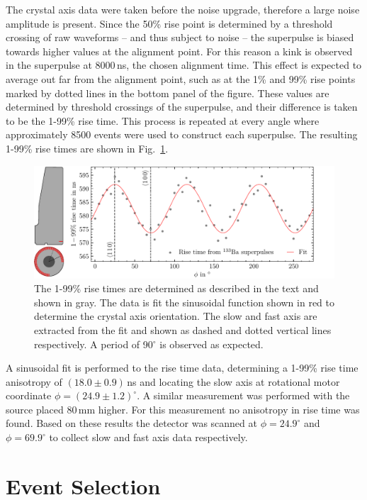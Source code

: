 The \BaS{} crystal axis data were taken before the noise upgrade, therefore a large noise amplitude is present. Since the 50\% rise point is determined by a threshold crossing of raw waveforms -- and thus subject to noise -- the superpulse is biased towards higher values at the alignment point. For this reason a kink is observed in the superpulse at 8000\,ns, the chosen alignment time. This effect is expected to average out far from the alignment point, such as at the 1\% and 99\% rise points marked by dotted lines in the bottom panel of the figure. These values are determined by threshold crossings of the superpulse, and their difference is taken to be the 1-99\% rise time. This process is repeated at every angle where approximately 8500 events were used to construct each superpulse. The resulting 1-99\% rise times are shown in Fig.~\ref{fig:crystal_axis_Ba}.  
\begin{figure}[htb]
    \centering
    \includegraphics[width=6in]{figs/pipeline/crystal_axis_Ba.pdf}
    \caption{The 1-99\% rise times are determined as described in the text and shown in gray. The data is fit the sinusoidal function shown in red to determine the crystal axis orientation. The slow and fast axis are extracted from the fit and shown as dashed and dotted vertical lines respectively. A period of 90$^\circ$ is observed as expected.}
    \label{fig:crystal_axis_Ba}
\end{figure}

A sinusoidal fit is performed to the rise time data, determining a 1-99\% rise time anisotropy of $(18.0\pm0.9)$\,ns and locating the slow axis at rotational motor coordinate $\phi = (24.9\pm1.2)^\circ$. A similar measurement was performed with the \BaS{} source placed 80\,mm higher. For this measurement no anisotropy in rise time was found. Based on these results the detector was scanned at $\phi = 24.9^\circ$ and $\phi = 69.9^\circ$ to collect slow and fast axis data respectively.

\section{Event Selection}

